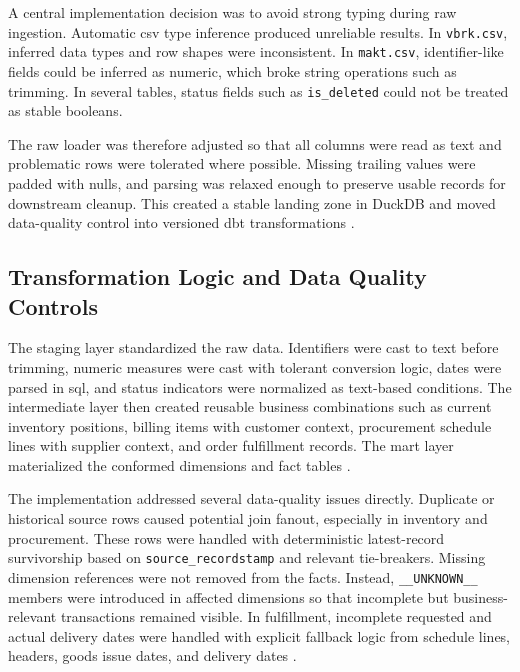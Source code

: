 A central implementation decision was to avoid strong typing during raw ingestion. Automatic \ac{csv} type inference produced unreliable results. In \texttt{vbrk.csv}, inferred data types and row shapes were inconsistent. In \texttt{makt.csv}, identifier-like fields could be inferred as numeric, which broke string operations such as trimming. In several tables, status fields such as \texttt{is\_deleted} could not be treated as stable booleans.

The raw loader was therefore adjusted so that all columns were read as text and problematic rows were tolerated where possible. Missing trailing values were padded with nulls, and parsing was relaxed enough to preserve usable records for downstream cleanup. This created a stable landing zone in DuckDB and moved data-quality control into versioned \ac{dbt} transformations \parencite{wang_beyond_1996}.

\subsection{Transformation Logic and Data Quality Controls}

The staging layer standardized the raw data. Identifiers were cast to text before trimming, numeric measures were cast with tolerant conversion logic, dates were parsed in \ac{sql}, and status indicators were normalized as text-based conditions. The intermediate layer then created reusable business combinations such as current inventory positions, billing items with customer context, procurement schedule lines with supplier context, and order fulfillment records. The mart layer materialized the conformed dimensions and fact tables \parencite{nambiar_overview_2022}.

The implementation addressed several data-quality issues directly. Duplicate or historical source rows caused potential join fanout, especially in inventory and procurement. These rows were handled with deterministic latest-record survivorship based on \texttt{source\_recordstamp} and relevant tie-breakers. Missing dimension references were not removed from the facts. Instead, \texttt{\_\_UNKNOWN\_\_} members were introduced in affected dimensions so that incomplete but business-relevant transactions remained visible. In fulfillment, incomplete requested and actual delivery dates were handled with explicit fallback logic from schedule lines, headers, goods issue dates, and delivery dates \parencite{wang_beyond_1996,yair_wand_anchoring_1996}.

